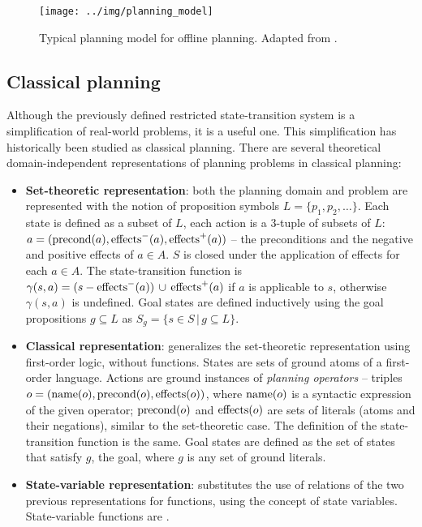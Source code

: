 \begin{figure}[h]
\begin{center}
\texttt{[image: ../img/planning\_model]}
\end{center}
\caption{Typical planning model for offline planning. Adapted from \cite[Figure 1.3]{Ghallab2004}.}
\end{figure}

\subsection{Classical planning}

Although the previously defined restricted state-transition system is a simplification of real-world
problems, it is a useful one. 
This simplification has historically been studied as classical planning.
There are several theoretical domain-independent representations
of planning problems in classical planning: \cite[Chapter 2]{Ghallab2004}


\begin{itemize}

\item \textbf{Set-theoretic representation}: both the planning domain and problem are represented with the notion
of proposition symbols $L = \{p_1, p_2, \ldots\}$. Each state is defined as a subset of $L$, each action
is a 3-tuple of subsets of $L$: $a = (\operatorname{\textrm{precond}}(a), \operatorname{\textrm{effects}}^-(a), \operatorname{\textrm{effects}}^+(a))$ -- the preconditions and
the negative and positive effects of $a \in A$. $S$ is closed under the application of effects
for each $a \in A$. The state-transition function is $\gamma(s, a) = (s - \operatorname{\textrm{effects}}^-(a)) \,\cup\,
\operatorname{\textrm{effects}}^+(a)$ if $a$ is applicable to $s$,
otherwise $\gamma(s, a)$ is undefined. Goal states are defined inductively using the goal propositions
$g \subseteq L$ as $S_g = \{s \in S \,|\, g \subseteq L\}$.
 
\item \textbf{Classical representation}:
generalizes the set-theoretic representation using first-order logic, without functions.
States are sets of ground atoms of a first-order language.
Actions are ground instances of \textit{planning operators}
-- triples $o = (\operatorname{\textrm{name}}(o), \operatorname{\textrm{precond}}(o), \operatorname{\textrm{effects}}(o))$,
where $\operatorname{\textrm{name}}(o)$ is a syntactic expression of the given operator;
$\operatorname{\textrm{precond}}(o)$ and $\operatorname{\textrm{effects}}(o)$ are sets of literals (atoms and their negations),
similar to the set-theoretic case.
The definition of the state-transition function is the same.
Goal states are defined as the set of states that satisfy $g$, the goal, where $g$ is any set
of ground literals.


\item \textbf{State-variable representation}: substitutes the use of relations of the two previous representations for functions, using the concept of state variables. State-variable functions are .

\end{itemize}

